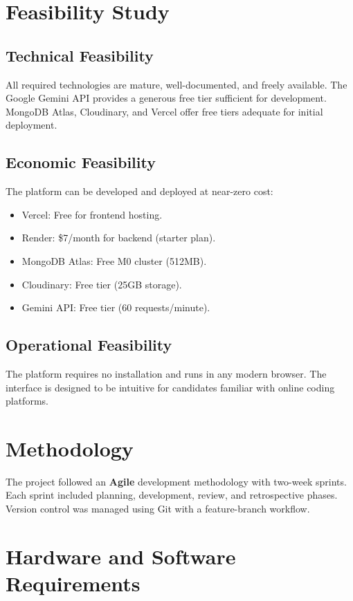 \section{Feasibility Study}

\subsection*{Technical Feasibility}
All required technologies are mature, well-documented, and freely available. The Google Gemini API provides a generous free tier sufficient for development. MongoDB Atlas, Cloudinary, and Vercel offer free tiers adequate for initial deployment.

\subsection*{Economic Feasibility}
The platform can be developed and deployed at near-zero cost:
\begin{itemize}
  \item Vercel: Free for frontend hosting.
  \item Render: \$7/month for backend (starter plan).
  \item MongoDB Atlas: Free M0 cluster (512MB).
  \item Cloudinary: Free tier (25GB storage).
  \item Gemini API: Free tier (60 requests/minute).
\end{itemize}

\subsection*{Operational Feasibility}
The platform requires no installation and runs in any modern browser. The interface is designed to be intuitive for candidates familiar with online coding platforms.

\section{Methodology}

The project followed an \textbf{Agile} development methodology with two-week sprints. Each sprint included planning, development, review, and retrospective phases. Version control was managed using Git with a feature-branch workflow.

\section{Hardware and Software Requirements}

